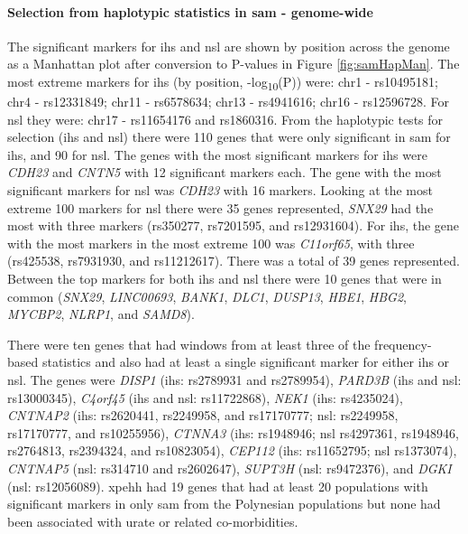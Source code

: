 \documentclass[]{report}
\let\oldparagraph\paragraph
\renewcommand{\paragraph}[1]{\oldparagraph{#1}\mbox{}}
\begin{document}
\paragraph{\texorpdfstring{Selection from haplotypic statistics in
\gls{sam} -
genome-wide}{Selection from haplotypic statistics in  - genome-wide}}\label{selection-from-haplotypic-statistics-in---genome-wide-1}

The significant markers for \gls{ihs} and \gls{nsl} are shown by
position across the genome as a Manhattan plot after conversion to
P-values in Figure \ref{fig:samHapMan}. The most extreme markers for
\gls{ihs} (by position, -log\textsubscript{10}(P)) were: chr1 -
rs10495181; chr4 - rs12331849; chr11 - rs6578634; chr13 - rs4941616;
chr16 - rs12596728. For \gls{nsl} they were: chr17 - rs11654176 and
rs1860316. From the haplotypic tests for selection (\gls{ihs} and
\gls{nsl}) there were 110 genes that were only significant in \gls{sam}
for \gls{ihs}, and 90 for \gls{nsl}. The genes with the most significant
markers for \gls{ihs} were \emph{CDH23} and \emph{CNTN5} with 12
significant markers each. The gene with the most significant markers for
\gls{nsl} was \emph{CDH23} with 16 markers. Looking at the most extreme
100 markers for \gls{nsl} there were 35 genes represented, \emph{SNX29}
had the most with three markers (rs350277, rs7201595, and rs12931604).
For \gls{ihs}, the gene with the most markers in the most extreme 100
was \emph{C11orf65}, with three (rs425538, rs7931930, and rs11212617).
There was a total of 39 genes represented. Between the top markers for
both \gls{ihs} and \gls{nsl} there were 10 genes that were in common
(\emph{SNX29}, \emph{LINC00693}, \emph{BANK1}, \emph{DLC1},
\emph{DUSP13}, \emph{HBE1}, \emph{HBG2}, \emph{MYCBP2}, \emph{NLRP1},
and \emph{SAMD8}).

There were ten genes that had windows from at least three of the
frequency-based statistics and also had at least a single significant
marker for either \gls{ihs} or \gls{nsl}. The genes were \emph{DISP1}
(\gls{ihs}: rs2789931 and rs2789954), \emph{PARD3B} (\gls{ihs} and
\gls{nsl}: rs13000345), \emph{C4orf45} (\gls{ihs} and \gls{nsl}:
rs11722868), \emph{NEK1} (\gls{ihs}: rs4235024), \emph{CNTNAP2}
(\gls{ihs}: rs2620441, rs2249958, and rs17170777; \gls{nsl}: rs2249958,
rs17170777, and rs10255956), \emph{CTNNA3} (\gls{ihs}: rs1948946;
\gls{nsl} rs4297361, rs1948946, rs2764813, rs2394324, and rs10823054),
\emph{CEP112} (\gls{ihs}: rs11652795; \gls{nsl} rs1373074),
\emph{CNTNAP5} (\gls{nsl}: rs314710 and rs2602647), \emph{SUPT3H}
(\gls{nsl}: rs9472376), and \emph{DGKI} (\gls{nsl}: rs12056089).
\Gls{xpehh} had 19 genes that had at least 20 populations with
significant markers in only \gls{sam} from the Polynesian populations
but none had been associated with urate or related co-morbidities.
\end{document}
